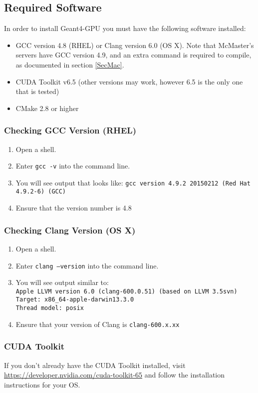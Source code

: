 \documentclass[12pt]{article}
\begin{document}
\subsection{Required Software} %
In order to install Geant4-GPU you must have the following software installed:
\begin{itemize}
\item GCC version 4.8 (RHEL) or Clang version 6.0 (OS X). Note that McMaster's servers have GCC version 4.9, and an extra command is required to compile, as documented in section \ref{SecMac}.
\item CUDA Toolkit v6.5 (other versions may work, however 6.5 is the only one that is tested)
\item CMake 2.8 or higher
\end{itemize}

\subsubsection{Checking GCC Version (RHEL)}
\begin{enumerate}
\item Open a shell.
\item Enter \texttt{gcc -v} into the command line.
\item You will see output that looks like:
\texttt{gcc version 4.9.2 20150212 (Red Hat 4.9.2-6) (GCC)}
\item Ensure that the version number is 4.8
\end{enumerate}

\subsubsection{Checking Clang Version (OS X)}
\begin{enumerate}
\item Open a shell.
\item Enter \texttt{clang --version} into the command line.
\item You will see output similar to: \\
\texttt{Apple LLVM version 6.0 (clang-600.0.51) (based on LLVM 3.5svn)}\\
\texttt{Target: x86\_64-apple-darwin13.3.0}\\
\texttt{Thread model: posix}
\item Ensure that your version of Clang is \texttt{clang-600.x.xx}
\end{enumerate}

\subsubsection{CUDA Toolkit}
If you don't already have the CUDA Toolkit installed, visit \url{https://developer.nvidia.com/cuda-toolkit-65} and follow the installation instructions for your OS.\\
\end{document}
